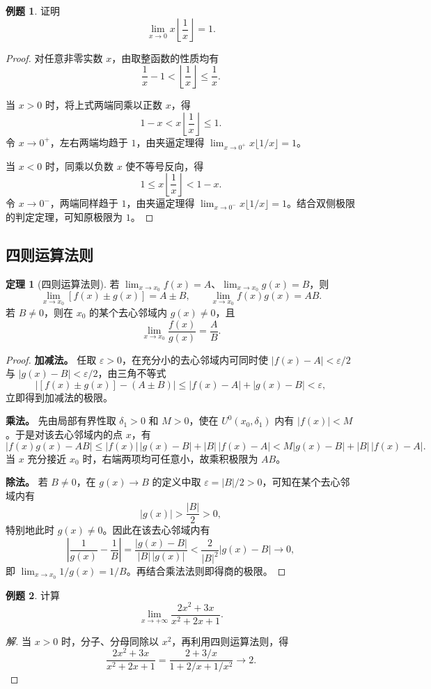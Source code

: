 \documentclass[UTF8,fontset=fandol,a4paper,12pt]{ctexart}
\newcommand{\U}{U}
\theoremstyle{definition}
\newtheorem{theorem}{定理}
\newtheorem*{example}{例题}
\begin{document}
\begin{example}
证明
\[
 \lim_{x\to0}x\left\lfloor\frac1x\right\rfloor=1.
\]
\end{example}
\begin{proof}
对任意非零实数 $x$，由取整函数的性质均有
\[
 \frac1x-1<\left\lfloor\frac1x\right\rfloor\le\frac1x.
\]

当 $x>0$ 时，将上式两端同乘以正数 $x$，得
\[
 1-x<x\left\lfloor\frac1x\right\rfloor\le1.
\]
令 $x\to0^+$，左右两端均趋于 $1$，由夹逼定理得 $\lim_{x\to0^+}x\lfloor1/x\rfloor=1$。

当 $x<0$ 时，同乘以负数 $x$ 使不等号反向，得
\[
 1\le x\left\lfloor\frac1x\right\rfloor<1-x.
\]
令 $x\to0^-$，两端同样趋于 $1$，由夹逼定理得 $\lim_{x\to0^-}x\lfloor1/x\rfloor=1$。结合双侧极限的判定定理，可知原极限为 $1$。
\end{proof}

\subsection*{四则运算法则}
\begin{theorem}[四则运算法则]
若 $\lim_{x\to x_0}f(x)=A$、$\lim_{x\to x_0}g(x)=B$，则
\[
 \lim_{x\to x_0}[f(x)\pm g(x)]=A\pm B,
 \qquad
 \lim_{x\to x_0}f(x)g(x)=AB.
\]
若 $B\ne0$，则在 $x_0$ 的某个去心邻域内 $g(x)\ne0$，且
\[
 \lim_{x\to x_0}\frac{f(x)}{g(x)}=\frac AB.
\]
\end{theorem}
\begin{proof}
\textbf{加减法。} 任取 $\varepsilon>0$，在充分小的去心邻域内可同时使 $|f(x)-A|<\varepsilon/2$ 与 $|g(x)-B|<\varepsilon/2$，由三角不等式
\[
 |[f(x)\pm g(x)]-(A\pm B)|
 \le |f(x)-A|+|g(x)-B|<\varepsilon,
\]
立即得到加减法的极限。

\textbf{乘法。} 先由局部有界性取 $\delta_1>0$ 和 $M>0$，使在 $\U^0(x_0,\delta_1)$ 内有 $|f(x)|<M$。于是对该去心邻域内的点 $x$，有
\[
 |f(x)g(x)-AB|
 \le |f(x)|\,|g(x)-B|+|B|\,|f(x)-A|
 <M|g(x)-B|+|B|\,|f(x)-A|.
\]
当 $x$ 充分接近 $x_0$ 时，右端两项均可任意小，故乘积极限为 $AB$。

\textbf{除法。} 若 $B\ne0$，在 $g(x)\to B$ 的定义中取 $\varepsilon=|B|/2>0$，可知在某个去心邻域内有
\[
 |g(x)|>\frac{|B|}{2}>0,
\]
特别地此时 $g(x)\ne0$。因此在该去心邻域内有
\[
 \left|\frac1{g(x)}-\frac1B\right|
 =\frac{|g(x)-B|}{|B|\,|g(x)|}
 <\frac2{|B|^2}|g(x)-B|\longrightarrow0,
\]
即 $\lim_{x\to x_0}1/g(x)=1/B$。再结合乘法法则即得商的极限。
\end{proof}

\begin{example}
计算
\[
 \lim_{x\to+\infty}\frac{2x^2+3x}{x^2+2x+1}.
\]
\end{example}
\begin{proof}[解]
当 $x>0$ 时，分子、分母同除以 $x^2$，再利用四则运算法则，得
\[
 \frac{2x^2+3x}{x^2+2x+1}
 =\frac{2+3/x}{1+2/x+1/x^2}\longrightarrow2.
\]
\end{proof}
\end{document}

